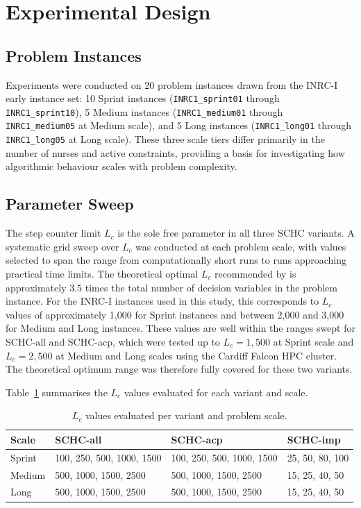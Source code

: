 \documentclass[12pt, a4paper, oneside]{report}
\begin{document}
\section{Experimental Design}
\label{sec:experimental_design}

\subsection{Problem Instances}
\label{sec:instances}

Experiments were conducted on 20 problem instances drawn from the
INRC-I early instance set: 10 Sprint instances
(\texttt{INRC1\_sprint01} through \texttt{INRC1\_sprint10}), 5
Medium instances (\texttt{INRC1\_medium01} through
\texttt{INRC1\_medium05} at Medium scale), and 5 Long
instances (\texttt{INRC1\_long01} through \texttt{INRC1\_long05}
at Long scale). These three scale tiers differ primarily in the
number of nurses and active constraints, providing a basis for
investigating how algorithmic behaviour scales with problem
complexity.

\subsection{Parameter Sweep}
\label{sec:sweep}

The step counter limit $L_c$ is the sole free parameter in all three
SCHC variants. A systematic grid sweep over $L_c$ was conducted at
each problem scale, with values selected to span the range from
computationally short runs to runs approaching practical time limits.
The theoretical optimal $L_c$ recommended by \citet{Bykov2016} is
approximately $3.5$ times the total number of decision variables in
the problem instance. For the INRC-I instances used in this study,
this corresponds to $L_c$ values of approximately 1,000 for Sprint
instances and between 2,000 and 3,000 for Medium and Long instances.
These values are well within the ranges swept for SCHC-all and
SCHC-acp, which were tested up to $L_c = 1{,}500$ at Sprint scale
and $L_c = 2{,}500$ at Medium and Long scales using the Cardiff
Falcon HPC cluster. The theoretical optimum range was therefore
fully covered for these two variants.

Table~\ref{tab:lc_values} summarises the $L_c$ values evaluated for
each variant and scale.

\begin{table}[H]
\centering
\caption{$L_c$ values evaluated per variant and problem scale.}
\label{tab:lc_values}
\begin{tabular}{llll}
\toprule
Scale & SCHC-all & SCHC-acp & SCHC-imp \\
\midrule
Sprint & 100, 250, 500, 1000, 1500 & 100, 250, 500, 1000, 1500 & 25, 50, 80, 100 \\
Medium & 500, 1000, 1500, 2500 & 500, 1000, 1500, 2500 & 15, 25, 40, 50 \\
Long   & 500, 1000, 1500, 2500 & 500, 1000, 1500, 2500 & 15, 25, 40, 50 \\
\bottomrule
\end{tabular}
\end{table}
\end{document}
